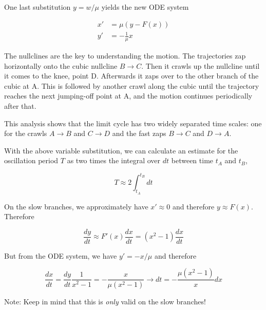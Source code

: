 One last substitution $y = w / \mu$ yields the new ODE system

\begin{align*}
x' &= \mu \left( y - F(x) \right) \\
y' &= - \frac{1}{\mu} x
\end{align*}

The nullclines are the key to understanding the motion. The trajectories zap horizontally onto the cubic nullcline $B \rightarrow C$. Then it crawls up the nullcline until it comes to the knee, point D. Afterwards it zaps over to the other branch of the cubic at A. This is followed by another crawl along the cubic until the trajectory reaches the next jumping-off point at A, and the motion continues periodically after that.

This analysis shows that the limit cycle has two widely separated time scales: one for the crawls $A \rightarrow B$ and $C \rightarrow D$ and the fast zaps $B \rightarrow C$ and $D \rightarrow A$.

With the above variable substitution, we can calculate an estimate for the oscillation period $T$ as two times the integral over $dt$ between time $t_A$ and $t_B$,

\begin{equation*}
T \approx 2 \int_{t_A}^{t_B} dt
\end{equation*}

On the slow branches, we approximately have $x' \approx 0$ and therefore $y \approx F(x)$. Therefore

\begin{equation*}
\frac{dy}{dt} \approx F'(x) \frac{dx}{dt} = (x^2 - 1) \frac{dx}{dt}
\end{equation*}

But from the ODE system, we have $y' = -x / \mu$ and therefore

\begin{equation*}
\frac{dx}{dt} = \frac{dy}{dt} \frac{1}{x^2-1} = - \frac{x}{\mu(x^2-1)} \rightarrow dt = - \frac{\mu(x^2-1)}{x} dx
\end{equation*}

Note: Keep in mind that this is \emph{only} valid on the slow branches!

